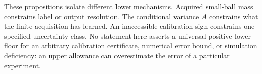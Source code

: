 These propositions isolate different lower mechanisms. Acquired small-ball mass constrains label or output resolution. The conditional variance $A$ constrains what the finite acquisition has learned. An inaccessible calibration sign constrains one specified uncertainty class. No statement here asserts a universal positive lower floor for an arbitrary calibration certificate, numerical error bound, or simulation deficiency: an upper allowance can overestimate the error of a particular experiment.
